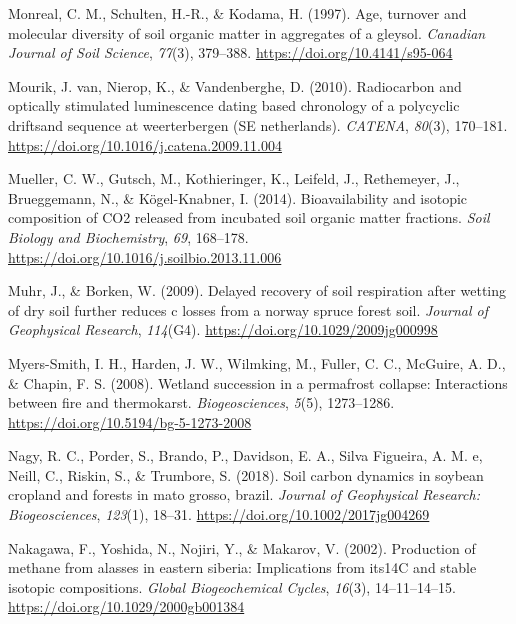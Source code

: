 \documentclass[]{article}
\begin{document}
\leavevmode\hypertarget{ref-Monreal_1997}{}%
Monreal, C. M., Schulten, H.-R., \& Kodama, H. (1997). Age, turnover and
molecular diversity of soil organic matter in aggregates of a gleysol.
\emph{Canadian Journal of Soil Science}, \emph{77}(3), 379--388.
\url{https://doi.org/10.4141/s95-064}

\leavevmode\hypertarget{ref-van_Mourik_2010}{}%
Mourik, J. van, Nierop, K., \& Vandenberghe, D. (2010). Radiocarbon and
optically stimulated luminescence dating based chronology of a
polycyclic driftsand sequence at weerterbergen (SE netherlands).
\emph{CATENA}, \emph{80}(3), 170--181.
\url{https://doi.org/10.1016/j.catena.2009.11.004}

\leavevmode\hypertarget{ref-Mueller_2014}{}%
Mueller, C. W., Gutsch, M., Kothieringer, K., Leifeld, J., Rethemeyer,
J., Brueggemann, N., \& Kögel-Knabner, I. (2014). Bioavailability and
isotopic composition of CO2 released from incubated soil organic matter
fractions. \emph{Soil Biology and Biochemistry}, \emph{69}, 168--178.
\url{https://doi.org/10.1016/j.soilbio.2013.11.006}

\leavevmode\hypertarget{ref-Muhr_2009}{}%
Muhr, J., \& Borken, W. (2009). Delayed recovery of soil respiration
after wetting of dry soil further reduces c losses from a norway spruce
forest soil. \emph{Journal of Geophysical Research}, \emph{114}(G4).
\url{https://doi.org/10.1029/2009jg000998}

\leavevmode\hypertarget{ref-Myers_Smith_2008}{}%
Myers-Smith, I. H., Harden, J. W., Wilmking, M., Fuller, C. C., McGuire,
A. D., \& Chapin, F. S. (2008). Wetland succession in a permafrost
collapse: Interactions between fire and thermokarst.
\emph{Biogeosciences}, \emph{5}(5), 1273--1286.
\url{https://doi.org/10.5194/bg-5-1273-2008}

\leavevmode\hypertarget{ref-Nagy_2018}{}%
Nagy, R. C., Porder, S., Brando, P., Davidson, E. A., Silva Figueira, A.
M. e, Neill, C., Riskin, S., \& Trumbore, S. (2018). Soil carbon
dynamics in soybean cropland and forests in mato grosso, brazil.
\emph{Journal of Geophysical Research: Biogeosciences}, \emph{123}(1),
18--31. \url{https://doi.org/10.1002/2017jg004269}

\leavevmode\hypertarget{ref-Nakagawa_2002}{}%
Nakagawa, F., Yoshida, N., Nojiri, Y., \& Makarov, V. (2002). Production
of methane from alasses in eastern siberia: Implications from its14C and
stable isotopic compositions. \emph{Global Biogeochemical Cycles},
\emph{16}(3), 14--11--14--15. \url{https://doi.org/10.1029/2000gb001384}
\end{document}
